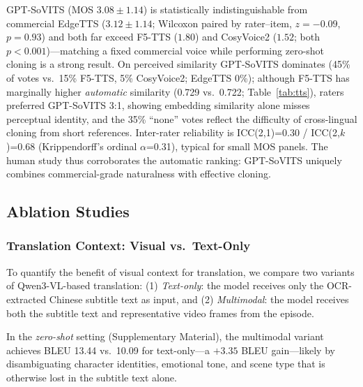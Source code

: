 \documentclass[journal]{IEEEtran}
\begin{document}
GPT-SoVITS (MOS $3.08\pm1.14$) is statistically indistinguishable from commercial EdgeTTS ($3.12\pm1.14$; Wilcoxon paired by rater--item, $z=-0.09$, $p=0.93$) and both far exceed F5-TTS ($1.80$) and CosyVoice2 ($1.52$; both $p<0.001$)---matching a fixed commercial voice while performing zero-shot cloning is a strong result.
On perceived similarity GPT-SoVITS dominates (45\% of votes vs.\ 15\% F5-TTS, 5\% CosyVoice2; EdgeTTS 0\%); although F5-TTS has marginally higher \emph{automatic} similarity (0.729 vs.\ 0.722; Table~\ref{tab:tts}), raters preferred GPT-SoVITS 3:1, showing embedding similarity alone misses perceptual identity, and the 35\% ``none'' votes reflect the difficulty of cross-lingual cloning from short references.
Inter-rater reliability is ICC(2,1)=0.30 / ICC(2,$k$)=0.68 (Krippendorff's ordinal $\alpha$=0.31), typical for small MOS panels.
The human study thus corroborates the automatic ranking: GPT-SoVITS uniquely combines commercial-grade naturalness with effective cloning.

\subsection{Ablation Studies}
\label{sec:ablation}

\subsubsection{Translation Context: Visual vs.\ Text-Only}
\label{sec:ablation_context}

To quantify the benefit of visual context for translation, we compare two variants of Qwen3-VL-based translation:
(1) \textit{Text-only}: the model receives only the OCR-extracted Chinese subtitle text as input, and
(2) \textit{Multimodal}: the model receives both the subtitle text and representative video frames from the episode.

In the \emph{zero-shot} setting (Supplementary Material), the multimodal variant achieves BLEU 13.44 vs.\ 10.09 for text-only---a $+3.35$ BLEU gain---likely by disambiguating character identities, emotional tone, and scene type that is otherwise lost in the subtitle text alone.
\end{document}
